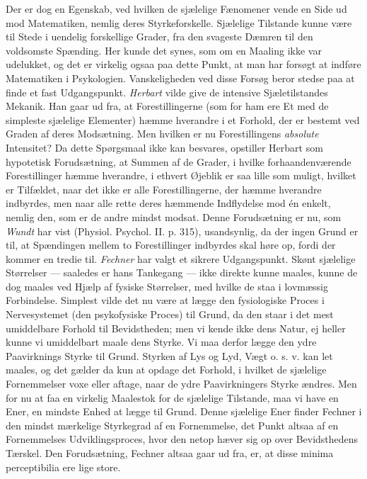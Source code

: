 \documentclass[12pt,a4paper,openany]{book}
\newcommand{\opage}[1]{\marginnote{\footnotesize\textit{[#1]}}}
\begin{document}
Der er dog en Egenskab, ved hvilken de sjælelige Fænomener vende en Side
ud mod Matematiken, nemlig deres Styrkeforskelle. Sjælelige Tilstande
kunne være til Stede i uendelig forskellige Grader, fra den svageste
Dæmren til den voldsomste Spænding. Her kunde det synes, som om en
Maaling ikke var udelukket, og det er virkelig ogsaa paa dette Punkt, at
man har forsøgt at indføre Matematiken i Psykologien. Vanskeligheden ved
disse Forsøg beror stedse paa at finde et fast Udgangspunkt.
\emph{Herbart} vilde give de intensive Sjæletilstandes Mekanik. Han gaar
ud fra, at Forestillingerne (som for ham ere Et med de simpleste
sjælelige Elementer) hæmme hverandre i et Forhold, der er bestemt ved
Graden af deres Modsætning. Men hvilken er nu Forestillingens
\emph{absolute} Intensitet? Da dette Spørgsmaal ikke kan besvares,
opstiller Herbart som hypotetisk Forudsætning, at Summen af de Grader, i
hvilke forhaandenværende Forestillinger hæmme hverandre, i ethvert
Øjeblik er saa lille som muligt, hvilket er Tilfældet, naar det ikke er
alle Forestillingerne, der hæmme hverandre indbyrdes, men naar alle
rette deres hæmmende Indflydelse mod én enkelt, nemlig den, som er de
andre mindst modsat. Denne Forudsætning er nu, som
\opage{26}\emph{Wundt} har vist (Physiol. Psychol. II. p. 315),
usandsynlig, da der ingen Grund er til, at Spændingen mellem to
Forestillinger indbyrdes skal høre op, fordi der kommer en tredie til.
\emph{Fechner} har valgt et sikrere Udgangspunkt. Skønt sjælelige
Størrelser --- saaledes er hans Tankegang --- ikke direkte kunne maales,
kunne de dog maales ved Hjælp af fysiske Størrelser, med hvilke de staa
i lovmæssig Forbindelse. Simplest vilde det nu være at lægge den
fysiologiske Proces i Nervesystemet (den psykofysiske Proces) til Grund,
da den staar i det mest umiddelbare Forhold til Bevidstheden; men vi
kende ikke dens Natur, ej heller kunne vi umiddelbart maale dens Styrke.
Vi maa derfor lægge den ydre Paavirknings Styrke til Grund. Styrken af
Lys og Lyd, Vægt o. s. v. kan let maales, og det gælder da kun at opdage
det Forhold, i hvilket de sjælelige Fornemmelser voxe eller aftage, naar
de ydre Paavirkningers Styrke ændres. Men for nu at faa en virkelig
Maalestok for de sjælelige Tilstande, maa vi have en Ener, en mindste
Enhed at lægge til Grund. Denne sjælelige Ener finder Fechner i den
mindst mærkelige Styrkegrad af en Fornemmelse, det Punkt altsaa af en
Fornemmelses Udviklingsproces, hvor den netop hæver sig op over
Bevidsthedens Tærskel. Den Forudsætning, Fechner altsaa gaar ud fra, er,
at disse minima perceptibilia ere lige store.
\end{document}
